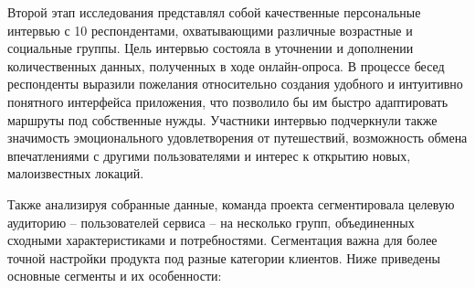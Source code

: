 \noindent Второй этап исследования представлял собой качественные персональные интервью с 10 респондентами, охватывающими различные возрастные и социальные группы. Цель интервью состояла в уточнении и дополнении количественных данных, полученных в ходе онлайн-опроса. В процессе бесед респонденты выразили пожелания относительно создания удобного и интуитивно понятного интерфейса приложения, что позволило бы им быстро адаптировать маршруты под собственные нужды. Участники интервью подчеркнули также значимость эмоционального удовлетворения от путешествий, возможность обмена впечатлениями с другими пользователями и интерес к открытию новых, малоизвестных локаций.

Также анализируя собранные данные, команда проекта сегментировала целевую аудиторию – пользователей сервиса – на несколько групп, объединенных сходными характеристиками и потребностями. Сегментация важна для более точной настройки продукта под разные категории клиентов. Ниже приведены основные сегменты и их особенности:
